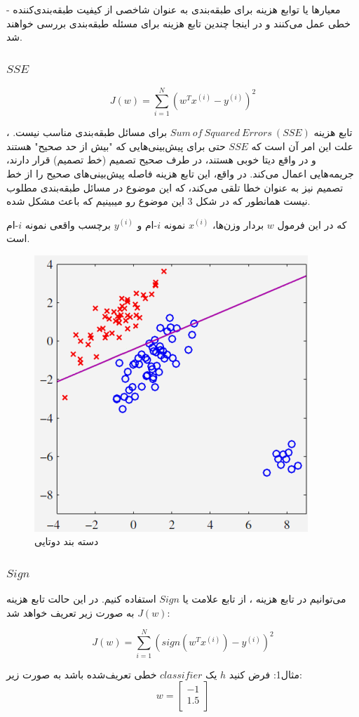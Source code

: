 \documentclass[12pt]{article}
\begin{document}
- معیارها یا توابع هزینه برای طبقه‌بندی به عنوان شاخصی از کیفیت طبقه‌بندی‌کننده خطی عمل می‌کنند و در اینجا چندین تابع هزینه برای مسئله طبقه‌بندی بررسی خواهند شد.
\subsubsection{$SSE$}

\[ J(w) = \sum_{i=1}^{N} (w^T x^{(i)} - y^{(i)})^2 \]

، تابع هزینه $Sum\:of\:Squared\:Errors\:(SSE)$ برای مسائل طبقه‌بندی مناسب نیست. علت این امر آن است که $SSE$ حتی برای پیش‌بینی‌هایی که "بیش از حد صحیح" هستند و در واقع دیتا خوبی هستند، در طرف صحیح تصمیم (خط تصمیم) قرار دارند، جریمه‌هایی اعمال می‌کند. در واقع، این تابع هزینه فاصله پیش‌بینی‌های صحیح را از خط تصمیم نیز به عنوان خطا تلقی می‌کند، که این موضوع در مسائل طبقه‌بندی مطلوب نیست همانطور که در شکل 3 این موضوع رو میبینیم که باعث مشکل شده.

که در این فرمول \( w \) بردار وزن‌ها، \( x^{(i)} \) نمونه $i$-ام و \( y^{(i)} \) برچسب واقعی نمونه $i$-ام است. 
\begin{figure}
    \centering
    \includegraphics[width=0.5\linewidth]{image3.png}
    \caption{دسته بند دوتایی}
    \label{fig:enter-label}
\end{figure}

\subsubsection{$Sign$}

می‌توانیم در تابع هزینه ، از تابع علامت یا $Sign$ استفاده کنیم. در این حالت تابع هزینه \( J(w) \) به صورت زیر تعریف خواهد شد:

\[ J(w) = \sum_{i=1}^{N} (\text{$sign$}(w^Tx^{(i)}) - y^{(i)})^2 \]


مثال1: فرض کنید $h$ یک $classifier$ خطی تعریف‌شده باشد به صورت زیر:
\[
w=\begin{bmatrix}
-1 \\
1.5 \\
\end{bmatrix}
\]
\end{document}

